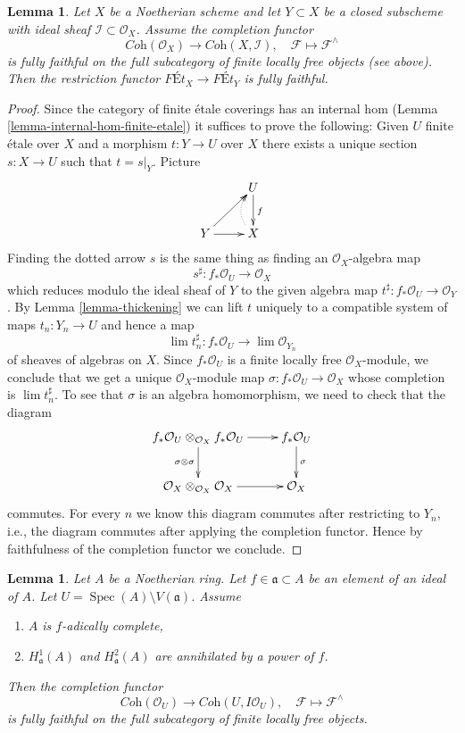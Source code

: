 \documentclass{amsart}
\theoremstyle{plain}
\newtheorem{lemma}[subsection]{Lemma}
\theoremstyle{definition}
\theoremstyle{remark}
\numberwithin{equation}{subsection}
\def\lim{\mathop{\mathrm{lim}}\nolimits}
\def\Spec{\mathop{\mathrm{Spec}}}
\begin{document}
\begin{lemma}
\label{lemma-restriction-fully-faithful}
Let $X$ be a Noetherian scheme and let $Y \subset X$ be a closed subscheme
with ideal sheaf $\mathcal{I} \subset \mathcal{O}_X$.
Assume the completion functor
$$
\textit{Coh}(\mathcal{O}_X)
\longrightarrow 
\textit{Coh}(X, \mathcal{I}),\quad
\mathcal{F} \longmapsto \mathcal{F}^\wedge
$$
is fully faithful on the full subcategory of finite locally free objects
(see above).
Then the restriction functor $\textit{F\'Et}_X \to \textit{F\'Et}_Y$
is fully faithful.
\end{lemma}

\begin{proof}
Since the category of finite \'etale coverings has an
internal hom (Lemma \ref{lemma-internal-hom-finite-etale})
it suffices to prove the following: Given $U$ finite \'etale over $X$
and a morphism $t : Y \to U$ over $X$ there exists a unique section
$s : X \to U$ such that $t = s|_Y$. Picture
$$
\xymatrix{
& U \ar[d]^f \\
Y \ar[r] \ar[ru] & X \ar@{..>}@/^1em/[u]
}
$$
Finding the dotted arrow $s$ is the same thing as finding an
$\mathcal{O}_X$-algebra map
$$
s^\sharp : f_*\mathcal{O}_U \longrightarrow \mathcal{O}_X
$$
which reduces modulo the ideal sheaf of $Y$ to the given algebra map
$t^\sharp : f_*\mathcal{O}_U \to \mathcal{O}_Y$.
By Lemma \ref{lemma-thickening} we can lift $t$ uniquely to a compatible
system of maps $t_n : Y_n \to U$ and hence a map
$$
\lim t_n^\sharp : f_*\mathcal{O}_U \longrightarrow \lim \mathcal{O}_{Y_n}
$$
of sheaves of algebras on $X$.
Since $f_*\mathcal{O}_U$ is a finite locally free $\mathcal{O}_X$-module,
we conclude that we get a unique $\mathcal{O}_X$-module map
$\sigma : f_*\mathcal{O}_U \to \mathcal{O}_X$ whose completion
is $\lim t_n^\sharp$. To see that $\sigma$ is an algebra homomorphism,
we need to check that the diagram
$$
\xymatrix{
f_*\mathcal{O}_U \otimes_{\mathcal{O}_X} f_*\mathcal{O}_U
\ar[r] \ar[d]_{\sigma \otimes \sigma} &
f_*\mathcal{O}_U \ar[d]^\sigma \\
\mathcal{O}_X \otimes_{\mathcal{O}_X} \mathcal{O}_X \ar[r] &
\mathcal{O}_X
}
$$
commutes. For every $n$ we know this diagram commutes after restricting
to $Y_n$, i.e., the diagram commutes after applying the completion functor.
Hence by faithfulness of the completion functor we conclude.
\end{proof}


\begin{lemma}
\label{algebraization-lemma-fully-faithful-alternative}
Let $A$ be a Noetherian ring. Let $f \in \mathfrak a \subset A$
be an element of an ideal of $A$. Let $U = \Spec(A) \setminus V(\mathfrak a)$.
Assume
\begin{enumerate}
\item $A$ is $f$-adically complete,
\item $H^1_\mathfrak a(A)$ and $H^2_\mathfrak a(A)$ are
annihilated by a power of $f$.
\end{enumerate}
Then the completion functor
$$
\textit{Coh}(\mathcal{O}_U)
\longrightarrow
\textit{Coh}(U, I\mathcal{O}_U),
\quad
\mathcal{F} \longmapsto \mathcal{F}^\wedge
$$
is fully faithful on the full subcategory of
finite locally free objects.
\end{lemma}
\end{document}
